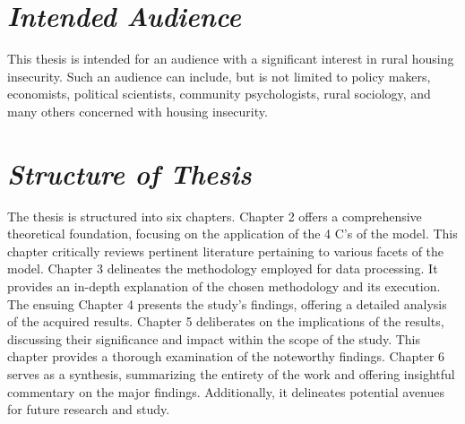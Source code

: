 \section{\textit{Intended Audience}}
This thesis is intended for an audience with a significant interest in rural housing insecurity. Such an audience can include, but is not limited to policy makers, economists, political scientists, community psychologists, rural sociology, and many others concerned with housing insecurity. 

\section{\textit{Structure of Thesis}}
The thesis is structured into six chapters. Chapter 2 offers a comprehensive theoretical foundation, focusing on the application of the 4 C's of the \hs model. This chapter critically reviews pertinent literature pertaining to various facets of the model. Chapter 3 delineates the methodology employed for data processing. It provides an in-depth explanation of the chosen methodology and its execution. The ensuing Chapter 4 presents the study's findings, offering a detailed analysis of the acquired results. Chapter 5 deliberates on the implications of the results, discussing their significance and impact within the scope of the study. This chapter provides a thorough examination of the noteworthy findings. Chapter 6 serves as a synthesis, summarizing the entirety of the work and offering insightful commentary on the major findings. Additionally, it delineates potential avenues for future research and study.

\endinput